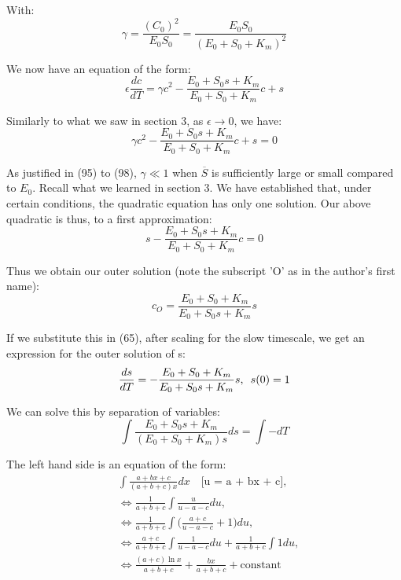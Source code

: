 \documentclass[12pt]{article}
\begin{document}
With:
\begin{equation}
\gamma = \frac{(C_0)^2}{E_0 S_0} = \frac{E_0 S_0}{(E_0 + S_0 + K_m)^2}
\end{equation}

We now have an equation of the form:
\begin{equation}
  \epsilon \frac{dc}{dT} = \gamma c^2 - \frac{E_0+S_0 s+K_m}{E_0 + S_0 + K_m} c + s
\end{equation}

Similarly to what we saw in section 3, as $\epsilon \to 0$, we have:
\begin{equation}
   \gamma c^2  - \frac{E_0+S_0 s+K_m}{E_0 + S_0 + K_m} c + s = 0
\end{equation}

As justified in (95) to (98), $\gamma \ll 1$ when $\overline{S}$ is
sufficiently large or small compared to $E_0$. Recall what we learned
in section 3. We have established that, under certain conditions, the
quadratic equation has only one solution. Our above quadratic is thus,
to a first approximation:
\begin{equation}
  s - \frac{E_0+S_0 s+K_m}{E_0 + S_0 + K_m} c = 0
\end{equation}

Thus we obtain our outer solution (note the subscript 'O' as in the
author's first name):
\begin{equation}
  c_O = \frac{E_0 + S_0 + K_m}{E_0+S_0 s+K_m} s
\end{equation}

If we substitute this in (65), after scaling for the slow timescale,
we get an expression for the outer solution of s:
\begin{equation}
\frac{ds}{dT} = - \frac{E_0 + S_0 + K_m}{E_0 + S_0s + K_m}s, \enskip s(0) = 1
\end{equation}

We can solve this by separation of variables:
\begin{equation}
\int \frac{E_0 + S_0 s + K_m}{(E_0 + S_0 + K_m) s} ds = \int - dT
\end{equation}

The left hand side is an equation of the form:
\begin{align}
&\int \frac{a + b x + c}{(a + b + c) x} dx
        \quad \text{[u = a + bx + c],} \\
&\iff \frac{1}{a+b+c} \int \frac{u}{u - a -c} du, \\
&\iff \frac{1}{a+b+c} \int \Big(\frac{a+c}{u - a -c} + 1\Big)
                          du, \\
&\iff \frac{a+c}{a+b+c} \int \frac{1}{u - a - c} du
                    + \frac{1}{a+b+c} \int 1 du, \\
&\iff \frac{(a+c) \ln{x}}{a+b+c} + \frac{bx}{a+b+c} + \text{constant}
\end{align}
\end{document}
